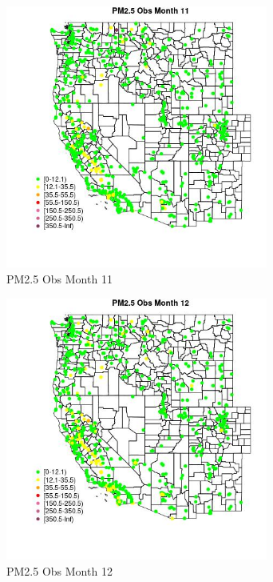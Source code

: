 \begin{figure} 
\centering  
\includegraphics[width=0.77\textwidth]{Code_Outputs/Report_ML_input_PM25_Step4_part_e_de_duplicated_aveswNAs_MapObsMo11PM25_Obs.jpg} 
\caption{\label{fig:Report_ML_input_PM25_Step4_part_e_de_duplicated_aveswNAsMapObsMo11PM25_Obs}PM2.5 Obs Month 11} 
\end{figure} 
 

\begin{figure} 
\centering  
\includegraphics[width=0.77\textwidth]{Code_Outputs/Report_ML_input_PM25_Step4_part_e_de_duplicated_aveswNAs_MapObsMo12PM25_Obs.jpg} 
\caption{\label{fig:Report_ML_input_PM25_Step4_part_e_de_duplicated_aveswNAsMapObsMo12PM25_Obs}PM2.5 Obs Month 12} 
\end{figure} 
 

